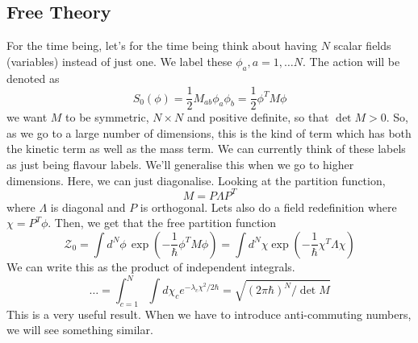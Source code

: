 \documentclass[11pt, oneside]{article}   	%
\theoremstyle{slanted}
\begin{document}
\subsection{Free Theory}
For the time being, let's 
for the time being think about having $ N $ 
scalar fields (variables) instead of just one.
We label these
$ \phi _ a , a = 1 , \dots N $. 
The action will be denoted as 
\[
S _ 0 \left( \phi  \right)   = 
\frac{1}{2 } M _{ ab} \phi _ a \phi _ b  = \frac{1}{2 } \phi ^ T M \phi 
\] we want $ M $ to be symmetric, $ N \times N $ and positive 
definite, so that $ \det M > 0 $. 
So, as we go to a large number of dimensions, 
this is the kind of term which has both the 
kinetic term as well as the mass term. 
We can currently think of these labels 
as just being flavour labels. 
We'll generalise this when we go to higher dimensions. 
Here, we can just diagonalise. 
Looking at the partition function, 
\[
M = P \Lambda P ^ T 
\] where $ \Lambda $ is diagonal and $ P $ is orthogonal. 
Lets also do a field redefinition where 
$ \chi  = P ^ T \phi $. 
Then, we get that the free partition function 
\[
\mathcal{ Z } _ 0  = \int d ^ N \phi \, \exp \left( 
 - \frac{1}{\hbar} \phi ^ T M \phi \right)  = 
 \int d ^ N \chi \exp  \left(  - \frac{1}{\hbar } 
 \chi ^ T \Lambda \chi \right) 
\] We can write this as the product of independent 
integrals. 
\[
\dots  = \int_{ c = 1 } ^ N \int d \chi _ c e ^{
- \lambda _ c \chi ^ 2  / 2 \hbar }  = \sqrt{ 
\left( 2 \pi \hbar  \right)  ^{ N } / \det M } 
\] This 
is a very useful result. 
When we have to introduce anti-commuting numbers, 
we will see something similar. 
\end{document}
